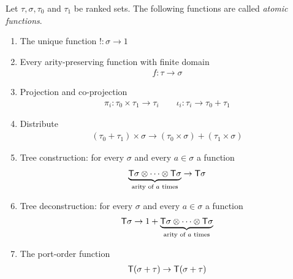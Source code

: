 \begin{definition}\label{def:atomic-functions}
    Let $\tau,\sigma,\tau_0$ and $\tau_1$ be ranked sets. The following functions are called \emph{atomic functions}. 
\begin{enumerate}
    \item The unique  function $! : \sigma \to 1$
    \item Every arity-preserving function with finite domain
    \begin{align*}
        f : \tau \to \sigma
    \end{align*}
    \item Projection and co-projection
    \begin{align*}
        \pi_i : \tau_0 \times \tau_1 \to \tau_i \qquad \iota_i : \tau_i \to \tau_0 + \tau_1
    \end{align*}
    \item Distribute
\begin{align*}
    (\tau_0 + \tau_1 ) \times \sigma \to (\tau_0 \times \sigma) + (\tau_1 \times \sigma)
\end{align*}
\item Tree construction: for every $\sigma$ and every $a \in \sigma$  a function
\begin{align*}
    \underbrace{\mathsf T \sigma \otimes \cdots \otimes \mathsf T \sigma}_{\text{arity of $a$ times}} \to \mathsf T \sigma
\end{align*}

\item Tree deconstruction: for every $\sigma$ and every $a \in \sigma$  a function
\begin{align*}
      \mathsf T \sigma \to 1 + \underbrace{\mathsf T \sigma \otimes \cdots \otimes \mathsf T \sigma}_{\text{arity of $a$ times}}
\end{align*}
\item The port-order function
\begin{align*}
\mathsf T (\sigma + \tau) \to \mathsf T (\sigma + \tau)
\end{align*}


\end{enumerate}
\end{definition}
